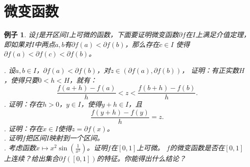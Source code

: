 \documentclass[12pt,UTF8]{ctexbook}
\newtheorem{ex}{例子}[section]
\begin{document}
\section{微变函数}


\begin{ex}\label{ex:3-2-4-0}
    设$f$是开区间$I$上可微的函数，下面要证明微变函数$\partial f$在$I$上满足介值定理，
    即如果对$I$中两点$a,b$有$\partial f(a) < \partial f(b)$，那么存在$c\in I$
    使得$\partial f(a) < \partial f(c) < \partial f(b)$。

    . 设$a,b\in I$，$\partial f(a) < \partial f(b)$，对$z \in (\partial f(a), \partial f(b))$，
    证明：有正实数$H$，使得只要$0 < h < H$，就有：
    $$ \frac{f(a + h) - f(a)}{h} < z < \frac{f(b + h) - f(b)}{h}. $$
    . 证明：存在$h>0$，$y\in I$，使得$y+h \in I$，且
    $$ \frac{f(y + h) - f(y)}{h} = z.$$
    . 证明：存在$x\in I$使得$z = \partial f(x)$。\\
    . 证明$f$把区间$I$映射到一个区间。\\
    . 考虑函数$x\mapsto x^2\sin{\left(\frac{1}{x^2}\right)}$。证明$f$在$[0,1]$上可微。
    $f$的微变函数是否在$[0,1]$上连续？给出集合$\partial f([0,1])$的特征。你能得出什么结论？
\end{ex}
\end{document}
